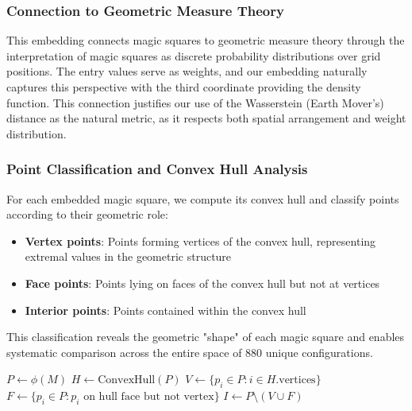 \subsubsection{Connection to Geometric Measure Theory}

This embedding connects magic squares to geometric measure theory through the interpretation of magic squares as discrete probability distributions over grid positions. The entry values serve as weights, and our embedding naturally captures this perspective with the third coordinate providing the density function. This connection justifies our use of the Wasserstein (Earth Mover's) distance as the natural metric, as it respects both spatial arrangement and weight distribution.

\subsubsection{Point Classification and Convex Hull Analysis}

For each embedded magic square, we compute its convex hull and classify points according to their geometric role:

\begin{itemize}
    \item \textbf{Vertex points}: Points forming vertices of the convex hull, representing extremal values in the geometric structure
    \item \textbf{Face points}: Points lying on faces of the convex hull but not at vertices  
    \item \textbf{Interior points}: Points contained within the convex hull
\end{itemize}

This classification reveals the geometric "shape" of each magic square and enables systematic comparison across the entire space of 880 unique configurations.

\begin{algorithm}[H]
\caption{Geometric Classification of Magic Square Points}
$P \leftarrow \phi(M)$ 
$H \leftarrow \text{ConvexHull}(P)$ 
$V \leftarrow \{p_i \in P : i \in H.\text{vertices}\}$ 
$F \leftarrow \{p_i \in P : p_i \text{ on hull face but not vertex}\}$\;
$I \leftarrow P \setminus (V \cup F)$ 
\end{algorithm}

